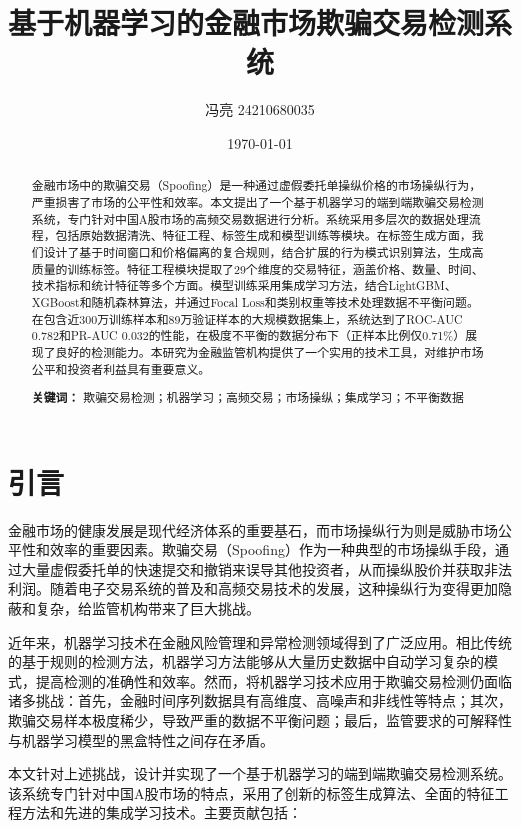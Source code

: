 \documentclass[12pt,a4paper]{article}
\title{基于机器学习的金融市场欺骗交易检测系统}
\author{冯亮 24210680035}
\date{\today}
\begin{document}

\newpage

\maketitle

\begin{abstract}
金融市场中的欺骗交易（Spoofing）是一种通过虚假委托单操纵价格的市场操纵行为，严重损害了市场的公平性和效率。本文提出了一个基于机器学习的端到端欺骗交易检测系统，专门针对中国A股市场的高频交易数据进行分析。系统采用多层次的数据处理流程，包括原始数据清洗、特征工程、标签生成和模型训练等模块。在标签生成方面，我们设计了基于时间窗口和价格偏离的复合规则，结合扩展的行为模式识别算法，生成高质量的训练标签。特征工程模块提取了29个维度的交易特征，涵盖价格、数量、时间、技术指标和统计特征等多个方面。模型训练采用集成学习方法，结合LightGBM、XGBoost和随机森林算法，并通过Focal Loss和类别权重等技术处理数据不平衡问题。在包含近300万训练样本和89万验证样本的大规模数据集上，系统达到了ROC-AUC 0.782和PR-AUC 0.032的性能，在极度不平衡的数据分布下（正样本比例仅0.71\%）展现了良好的检测能力。本研究为金融监管机构提供了一个实用的技术工具，对维护市场公平和投资者利益具有重要意义。

\textbf{关键词：} 欺骗交易检测；机器学习；高频交易；市场操纵；集成学习；不平衡数据
\end{abstract}

\section{引言}

金融市场的健康发展是现代经济体系的重要基石，而市场操纵行为则是威胁市场公平性和效率的重要因素。欺骗交易（Spoofing）作为一种典型的市场操纵手段，通过大量虚假委托单的快速提交和撤销来误导其他投资者，从而操纵股价并获取非法利润。随着电子交易系统的普及和高频交易技术的发展，这种操纵行为变得更加隐蔽和复杂，给监管机构带来了巨大挑战。

近年来，机器学习技术在金融风险管理和异常检测领域得到了广泛应用。相比传统的基于规则的检测方法，机器学习方法能够从大量历史数据中自动学习复杂的模式，提高检测的准确性和效率。然而，将机器学习技术应用于欺骗交易检测仍面临诸多挑战：首先，金融时间序列数据具有高维度、高噪声和非线性等特点；其次，欺骗交易样本极度稀少，导致严重的数据不平衡问题；最后，监管要求的可解释性与机器学习模型的黑盒特性之间存在矛盾。

本文针对上述挑战，设计并实现了一个基于机器学习的端到端欺骗交易检测系统。该系统专门针对中国A股市场的特点，采用了创新的标签生成算法、全面的特征工程方法和先进的集成学习技术。主要贡献包括：
\end{document}
